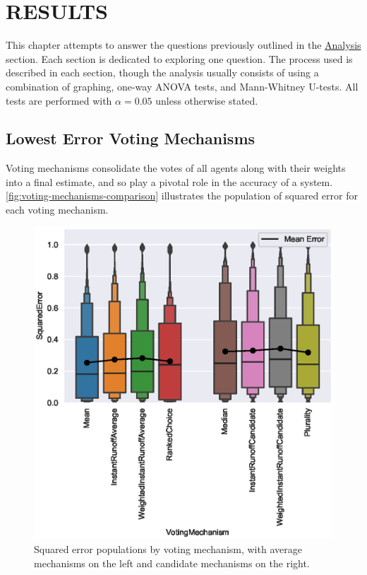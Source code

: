 %
%

\chapter{RESULTS}\label{ch:results}
This chapter attempts to answer the questions previously outlined in the
\hyperref[subsec:analysis]{Analysis} section.
Each section is dedicated to exploring one question.
The process used is described in each section, though the analysis usually consists
of using a combination of graphing, one-way ANOVA tests, and Mann-Whitney
U-tests.
All tests are performed with $\alpha = 0.05$ unless otherwise stated.


\section{Lowest Error Voting Mechanisms}\label{sec:lowest-error-voting-mechanism}
Voting mechanisms consolidate the votes of all agents along with their weights
into a final estimate, and so play a pivotal role in the accuracy of a system.
\autoref{fig:voting-mechanisms-comparison} illustrates the population of
squared error for each voting mechanism.

\begin{figure}[htbp]
    \centering
    \includegraphics[scale=0.75]
    {./content/figures/voting_mechanisms/voting_mechanisms_comparison}
    \caption{Squared error populations by voting mechanism, with average
    mechanisms on the left and candidate mechanisms on the right.}
    \label{fig:voting-mechanisms-comparison}
\end{figure}


